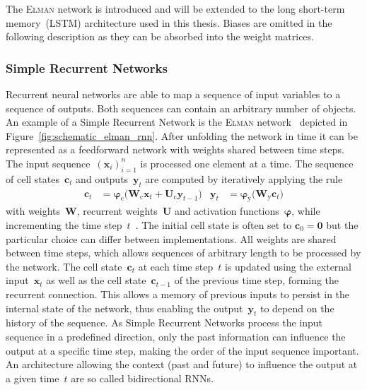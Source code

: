 The \textsc{Elman} network is introduced and will be extended to the long
short-term memory~(LSTM) architecture used in this thesis. Biases are omitted in
the following description as they can be absorbed into the weight matrices.

\subsubsection{Simple Recurrent Networks}
\label{sec:simple_recurrent_networks}
Recurrent neural networks are able to map a sequence of input variables to a
sequence of outputs. Both sequences can contain an arbitrary number of objects.
An example of a Simple Recurrent Network is the \textsc{Elman}
network~\cite{elman} depicted in Figure~\ref{fig:schematic_elman_rnn}. After
unfolding the network in time it can be represented as a feedforward network
with weights shared between time steps. The input
sequence~$\left( \mathbf{x}_i \right)_{i=1}^n$ is processed one element at a
time. The sequence of cell states~$\mathbf{c}_t$ and outputs~$\mathbf{y}_t$ are
computed by iteratively applying the rule
\begin{align*}
  \mathbf{c}_t &= \bm{\varphi}_{\text{c}}\Big( \mathbf{W}_{\text{c}} \mathbf{x}_{t} + \mathbf{U}_{\text{c}} \mathbf{y}_{t-1} \Big)
  &\mathbf{y}_t &= \bm{\varphi}_{\text{y}}\Big( \mathbf{W}_{\text{y}} \mathbf{c}_{t} \Big)
\end{align*}
with weights~$\mathbf{W}$, recurrent weights~$\mathbf{U}$ and activation
functions~$\bm{\varphi}$, while incrementing the time step~$t$~\cite{elman,
  graves}. The initial cell state is often set to $\mathbf{c}_0 = \mathbf{0}$
but the particular choice can differ between implementations. All weights are
shared between time steps, which allows sequences of arbitrary length to be
processed by the network. The cell state~$\mathbf{c}_t$ at each time step~$t$ is
updated using the external input~$\mathbf{x}_t$ as well as the cell
state~$\mathbf{c}_{t-1}$ of the previous time step, forming the recurrent
connection. This allows a memory of previous inputs to persist in the internal
state of the network, thus enabling the output~$\mathbf{y}_t$ to depend on the
history of the sequence. As Simple Recurrent Networks process the input sequence
in a predefined direction, only the past information can influence the output at
a specific time step, making the order of the input sequence important. An
architecture allowing the context (past and future) to influence the output at a
given time~$t$ are so called bidirectional RNNs.

